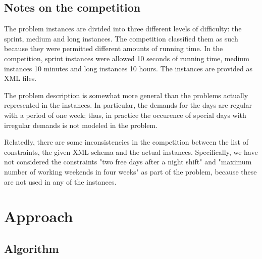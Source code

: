 \documentclass{article}
\begin{document}
\subsection{Notes on the competition}

The problem instances are divided into three different levels of difficulty: the sprint, medium and long instances.
The competition classified them as such because they were permitted different amounts of running time.
In the competition, sprint instances were allowed 10 seconds of running time, medium instances 10 minutes and long instances 10 hours.
The instances are provided as XML files.

The problem description is somewhat more general than the problems actually represented in the instances.
In particular, the demands for the days are regular with a period of one week; thus, in practice the occurence of special days with irregular demands is not modeled in the problem.

Relatedly, there are some inconsistencies in the competition between the list of constraints, the given XML schema and the actual instances.
Specifically, we have not considered the constraints "two free days after a night shift" and "maximum number of working weekends in four weeks" as part of the problem, because these are not used in any of the instances.

\section{Approach}
\subsection{Algorithm}
\end{document}
